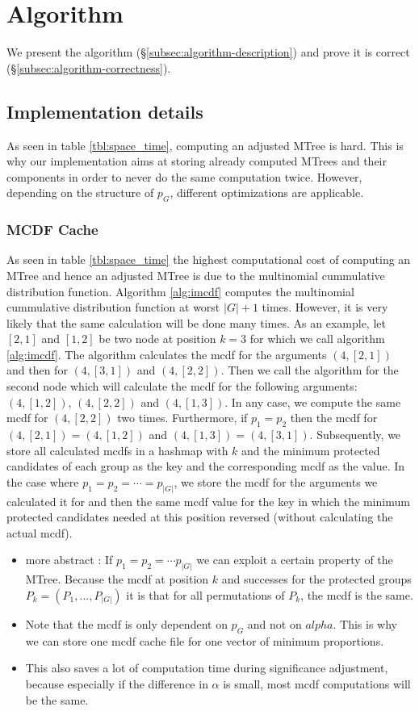 \section{Algorithm}\label{sec:algorithms}
We present the \algoFAIR algorithm (\S\ref{subsec:algorithm-description}) and prove it is correct (\S\ref{subsec:algorithm-correctness}).

\subsection{Implementation details}\label{subsec:implementation-details}
As seen in table \ref{tbl:space_time}, computing an adjusted MTree is hard. This is why our implementation aims at storing already computed MTrees and their components in order to never do the same computation twice. However, depending on the structure of $p_G$, different optimizations are applicable.
\subsubsection{MCDF Cache}\label{subsubsec:mcdf-cache}
As seen in table \ref{tbl:space_time} the highest computational cost of computing an MTree and hence an adjusted MTree is due to the multinomial cummulative distribution function. Algorithm \ref{alg:imcdf} computes the multinomial cummulative distribution function at worst $|G|+1$ times. However, it is very likely that the same calculation will be done many times. As an example, let $[2,1]$ and $[1,2]$ be two node at position $k=3$ for which we call algorithm \ref{alg:imcdf}. The algorithm calculates the mcdf for the arguments $(4,[2,1])$ and then for $(4,[3,1])$ and $(4,[2,2])$. Then we call the algorithm for the second node which will calculate the mcdf for the following arguments: $(4,[1,2])$, $(4,[2,2])$ and $(4,[1,3])$. In any case, we compute the same mcdf for $(4,[2,2])$ two times. Furthermore, if $p_1 = p_2$ then the mcdf for $(4,[2,1]) = (4,[1,2])$ and  $(4,[1,3]) = (4,[3,1])$. Subsequently, we store all calculated mcdfs in a hashmap with $k$ and the minimum protected candidates of each group as the key and the corresponding mcdf as the value. In the case where $p_1 = p_2 = \cdots = p_{|G|}$, we store the mcdf for the arguments we calculated it for and then the same mcdf value for the key in which the minimum protected candidates needed at this position reversed (without calculating the actual mcdf).
\begin{itemize}
\item more abstract : If $p_1 = p_2 = \cdots p_{|G|}$ we can exploit a certain property of the MTree. Because the mcdf at position $k$ and successes for the protected groups $P_k = (P_1, ..., P_{|G|})$ it is that for all permutations of $P_k$, the mcdf is the same.
\item Note that the mcdf is only dependent on $p_G$ and not on $alpha$. This is why we can store one mcdf cache file for one vector of minimum proportions.
\item This also saves a lot of computation time during significance adjustment, because especially if the difference in $\alpha$ is small, most mcdf computations will be the same.

\end{itemize}
